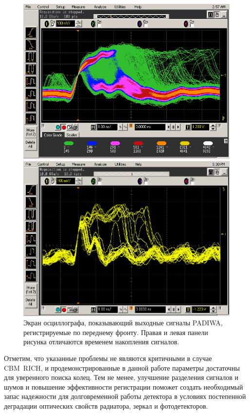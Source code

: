 \begin{figure}[H]
\begin{minipage}[b]{0.495\textwidth}
\includegraphics[width=1.0\textwidth]{pictures/28_Scope_additional.png}
\end{minipage}
\hspace{0.01\textwidth}
\begin{minipage}[b]{0.495\textwidth}
\includegraphics[width=1.0\textwidth]{pictures/28_Scope2.png}
\end{minipage}
\caption{Экран осциллографа, показывающий выходные сигналы PADIWA, регистрируемые по переднему фронту. Правая и левая панели рисунка отличаются временем накопления сигналов.}
\label{fig:ToTscope}
\end{figure}

Отметим, что указанные проблемы не являются критичными в случае CBM~RICH, и продемонстрированные в данной работе параметры достаточны для уверенного поиска колец. Тем не менее, улучшение разделения сигналов и шумов и повышение эффективности регистрации поможет создать необходимый запас надежности для долговременной работы детектора в условиях постепенной деградации оптических свойств радиатора, зеркал и фотодетекторов.

